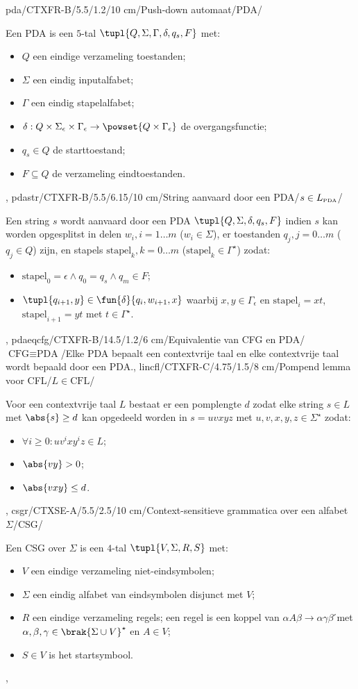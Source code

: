 pda/CTXFR-B/5.5/1.2/10 cm/Push-down automaat/PDA/{Een PDA is een $5$-tal $\tupl{Q,\Sigma,\Gamma,\delta,q_s,F}$ met:\begin{itemize}\item $Q$ een eindige verzameling toestanden;\item $\Sigma$ een eindig inputalfabet;\item $\Gamma$ een eindig stapelalfabet;\item $\delta:Q\times\Sigma_{\epsilon}\times\Gamma_{\epsilon}\rightarrow\powset{Q\times\Gamma_{\epsilon}}$ de overgangsfunctie;\item $q_s\in Q$ de starttoestand;\item $F\subseteq Q$ de verzameling eindtoestanden.\end{itemize}},
pdastr/CTXFR-B/5.5/6.15/10 cm/String aanvaard door een PDA/$s\in L_{\mbox{\tiny PDA}}$/{Een string $s$ wordt aanvaard door een PDA $\tupl{Q,\Sigma,\delta,q_s,F}$ indien $s$ kan worden opgesplitst in delen $w_i,i=1\ldots m$ ($w_i\in\Sigma$), er toestanden $q_j,j=0\ldots m$ ($q_j\in Q$) zijn, en stapels $\mbox{stapel}_k,k=0\ldots m$ ($\mbox{stapel}_k\in\Gamma^{\star}$) zodat:\begin{itemize}\item $\mbox{stapel}_0=\epsilon\wedge q_0=q_s\wedge q_m\in F$;\item $\tupl{q_{i+1},y}\in\fun{\delta}{q_i,w_{i+1},x}$ waarbij $x,y\in\Gamma_{\epsilon}$ en $\mbox{stapel}_i=xt$, $\mbox{stapel}_{i+1}=yt$ met $t\in\Gamma^{\star}$.\end{itemize}},
pdaeqcfg/CTXFR-B/14.5/1.2/6 cm/Equivalentie van CFG en PDA/$\mbox{CFG}\equiv\mbox{PDA}$/{Elke PDA bepaalt een contextvrije taal en elke contextvrije taal wordt bepaald door een PDA.},
lincfl/CTXFR-C/4.75/1.5/8 cm/Pompend lemma voor CFL/$L\in\mbox{CFL}$/{Voor een contextvrije taal $L$ bestaat er een pomplengte $d$ zodat elke string $s\in L$ met $\abs{s}\geq d$ kan opgedeeld worden in $s=uvxyz$ met $u,v,x,y,z\in\Sigma^{\star}$ zodat:\begin{itemize}\item $\forall i\geq 0:uv^ixy^iz\in L$;\item $\abs{vy}>0$;\item $\abs{vxy}\leq d$.\end{itemize}},
csgr/CTXSE-A/5.5/2.5/10 cm/Context-sensitieve grammatica over een alfabet $\Sigma$/CSG/{Een CSG over $\Sigma$ is een $4$-tal $\tupl{V,\Sigma,R,S}$ met:\begin{itemize}\item $V$ een eindige verzameling niet-eindsymbolen;\item $\Sigma$ een eindig alfabet van eindsymbolen disjunct met $V$;\item $R$ een eindige verzameling regels; een regel is een koppel van $\alpha A\beta\rightarrow\alpha\gamma\beta$ ́met $\alpha,\beta,\gamma\in\brak{\Sigma\cup V}^{\star}$ en $A\in V$;\item $S\in V$ is het startsymbool.\end{itemize}},

